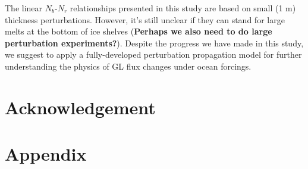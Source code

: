 \documentclass[review,oneside]{igs}
\begin{document}
The linear $N_b$-$N_r$ relationships presented in this study are based on small (1 m) thickness perturbations. However, it's still unclear if they can stand for large melts at the bottom of ice shelves ({\bf{Perhaps we also need to do large perturbation experiments?}}). Despite the progress we have made in this study, we suggest to apply a fully-developed perturbation propagation model for further understanding the physics of GL flux changes under ocean forcings. 

\section{Acknowledgement}



\section{Appendix}

\renewcommand{\thefigure}{A\arabic{figure}}
\setcounter{figure}{0}

%
%
\end{document}
